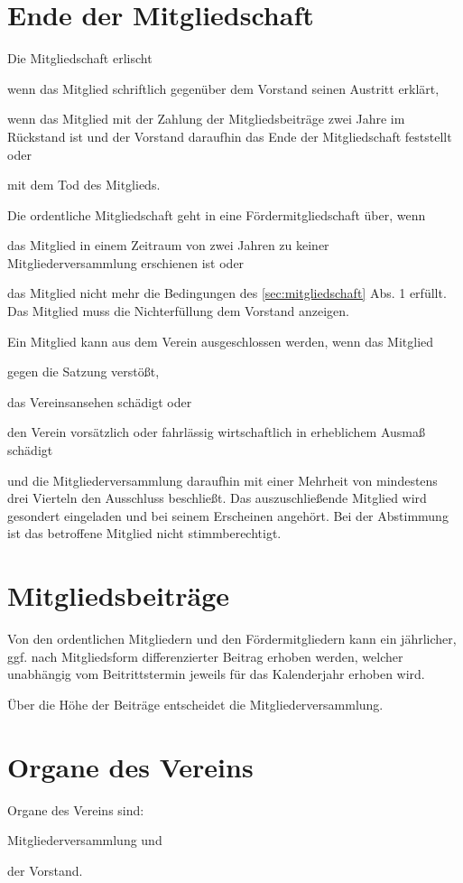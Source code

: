 \section{Ende der Mitgliedschaft}\label{sec:ende_der_mitgliedschaft}
\begin{absätze}
    \item Die Mitgliedschaft erlischt
    \begin{sätze}
        \item wenn das Mitglied schriftlich gegenüber dem Vorstand seinen Austritt erklärt,
        \item wenn das Mitglied mit der Zahlung der Mitgliedsbeiträge zwei Jahre im Rückstand ist und der Vorstand daraufhin das Ende der Mitgliedschaft feststellt oder
        \item mit dem Tod des Mitglieds.
    \end{sätze}
    \item Die ordentliche Mitgliedschaft geht in eine Fördermitgliedschaft über, wenn
    \begin{sätze}
        \item das Mitglied in einem Zeitraum von zwei Jahren zu keiner Mitgliederversammlung erschienen ist oder
        \item das Mitglied nicht mehr die Bedingungen des \ref{sec:mitgliedschaft} Abs. 1 erfüllt. Das Mitglied muss die Nichterfüllung dem Vorstand anzeigen.
    \end{sätze}
    \item Ein Mitglied kann aus dem Verein ausgeschlossen werden, wenn das Mitglied
    \begin{sätze}
        \item gegen die Satzung verstößt,
        \item das Vereinsansehen schädigt oder
        \item den Verein vorsätzlich oder fahrlässig wirtschaftlich in erheblichem Ausmaß schädigt
    \end{sätze}
    und die Mitgliederversammlung daraufhin mit einer Mehrheit von mindestens drei Vierteln den Ausschluss beschließt. Das auszuschließende Mitglied wird gesondert eingeladen und bei seinem Erscheinen angehört. Bei der Abstimmung ist das betroffene Mitglied nicht stimmberechtigt.
	\end{absätze}

\section{Mitgliedsbeiträge}
	\begin{absätze}
		\item Von den ordentlichen Mitgliedern und den Fördermitgliedern kann ein jährlicher, ggf. nach Mitgliedsform differenzierter Beitrag erhoben werden, welcher unabhängig vom Beitrittstermin jeweils für das Kalenderjahr erhoben wird.
		\item Über die Höhe der Beiträge entscheidet die Mitgliederversammlung.
	\end{absätze}

\section{Organe des Vereins}
    Organe des Vereins sind:
	\begin{compactenum}
		\item Mitgliederversammlung und
		\item der Vorstand.
	\end{compactenum}

